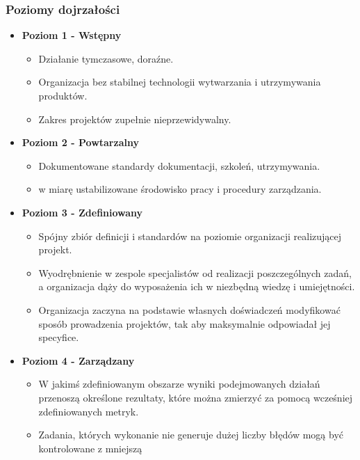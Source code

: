 \documentclass[a4paper]{article}
\begin{document}
    \subsubsection{Poziomy dojrzałości}
    \begin{itemize}
        \item \textbf{Poziom 1 - Wstępny}
        \begin{itemize}
            \item Działanie tymczasowe, doraźne.
            \item Organizacja bez stabilnej technologii wytwarzania i utrzymywania produktów.
            \item Zakres projektów zupełnie nieprzewidywalny.
        \end{itemize}
        \item \textbf{Poziom 2 - Powtarzalny}
        \begin{itemize}
            \item Dokumentowane standardy dokumentacji, szkoleń, utrzymywania.
            \item w miarę ustabilizowane środowisko pracy i procedury zarządzania.
        \end{itemize}
        \item \textbf{Poziom 3 - Zdefiniowany}
        \begin{itemize}
            \item Spójny zbiór definicji i standardów na poziomie
            organizacji realizującej projekt.
            \item Wyodrębnienie w zespole specjalistów od realizacji
            poszczególnych zadań, a organizacja dąży do wyposażenia ich
            w niezbędną wiedzę i umiejętności.
            \item Organizacja zaczyna na podstawie własnych doświadczeń
            modyfikować sposób prowadzenia projektów, tak aby
            maksymalnie odpowiadał jej specyfice.
        \end{itemize}
        \item \textbf{Poziom 4 - Zarządzany}
        \begin{itemize}
            \item W jakimś zdefiniowanym obszarze wyniki podejmowanych działań
            przenoszą określone rezultaty, które można zmierzyć za
            pomocą wcześniej zdefiniowanych metryk.
            \item Zadania, których wykonanie nie generuje dużej liczby
            błędów mogą być kontrolowane z mniejszą

\end{itemize}
\end{itemize}
\end{document}
